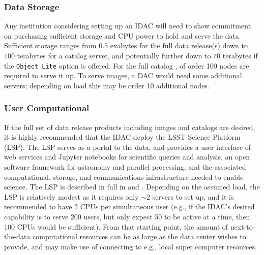 \subsubsection{Data Storage}
Any institution considering setting up an IDAC will need to show commitment on purchasing sufficient storage and CPU power to hold and serve the data. Sufficient storage ranges from $0.5$ exabytes for the full data release(s) down to $100$ terabytes for a catalog server, and potentially further down to $70$ terabytes if the {\tt Object Lite} option is offered. For the full catalog , of order 100 nodes are required to serve it up. To serve images, a DAC would need some additional servers; depending on load this may be order 10 additional nodes.

\subsubsection{User Computational}
If the full set of data release products including images and catalogs are desired, it is highly recommended that the IDAC deploy the LSST Science Platform (LSP). The LSP serves as a portal to the data, and provides a user interface of web services and Jupyter notebooks for scientific queries and analysis, an open software framework for astronomy and parallel processing, and the associated computational, storage, and communications infrastructure needed to enable science. The LSP is described in full in  and . Depending on the assumed load, the LSP is relatively modest as it requires only $\sim2$ servers to set up, and it is recommended to have 2 CPUs per simultaneous user (e.g., if the IDAC's desired capability is to serve 200 users, but only expect 50 to be active at a time, then 100 CPUs would be sufficient). From that starting point, the amount of next-to-the-data computational resources can be as large as the data center wishes to provide, and may make use of connecting to e.g., local super computer resources.

